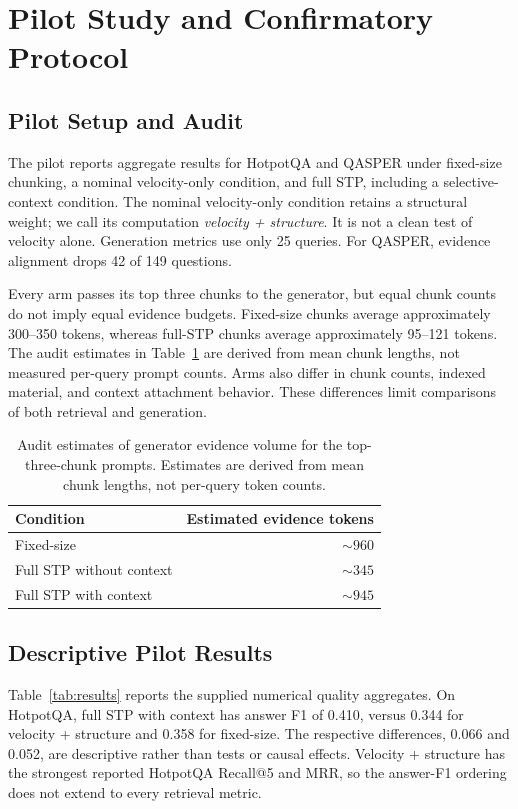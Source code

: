 \documentclass[10pt]{article}
\begin{document}
\section{Pilot Study and Confirmatory Protocol}

\subsection{Pilot Setup and Audit}

The pilot reports aggregate results for HotpotQA and QASPER under fixed-size chunking, a nominal velocity-only condition, and full STP, including a selective-context condition. The nominal velocity-only condition retains a structural weight; we call its computation \emph{velocity + structure}. It is not a clean test of velocity alone. Generation metrics use only 25 queries. For QASPER, evidence alignment drops 42 of 149 questions.

Every arm passes its top three chunks to the generator, but equal chunk counts do not imply equal evidence budgets. Fixed-size chunks average approximately 300--350 tokens, whereas full-STP chunks average approximately 95--121 tokens. The audit estimates in Table~\ref{tab:volume} are derived from mean chunk lengths, not measured per-query prompt counts. Arms also differ in chunk counts, indexed material, and context attachment behavior. These differences limit comparisons of both retrieval and generation.

\begin{table}[t]
\centering
\begin{tabular}{lr}
\toprule
Condition & Estimated evidence tokens \\
\midrule
Fixed-size & $\sim 960$ \\
Full STP without context & $\sim 345$ \\
Full STP with context & $\sim 945$ \\
\bottomrule
\end{tabular}
\caption{Audit estimates of generator evidence volume for the top-three-chunk prompts. Estimates are derived from mean chunk lengths, not per-query token counts.}
\label{tab:volume}
\end{table}

\subsection{Descriptive Pilot Results}

Table~\ref{tab:results} reports the supplied numerical quality aggregates. On HotpotQA, full STP with context has answer F1 of 0.410, versus 0.344 for velocity + structure and 0.358 for fixed-size. The respective differences, 0.066 and 0.052, are descriptive rather than tests or causal effects. Velocity + structure has the strongest reported HotpotQA Recall@5 and MRR, so the answer-F1 ordering does not extend to every retrieval metric.
\end{document}
